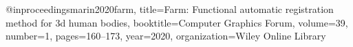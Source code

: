 @inproceedings{marin2020farm,
  title={Farm: Functional automatic registration method for 3d human bodies},
  booktitle={Computer Graphics Forum},
  volume={39},
  number={1},
  pages={160--173},
  year={2020},
  organization={Wiley Online Library}
}